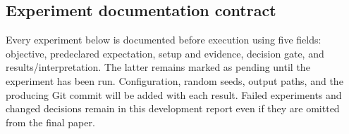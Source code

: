 \subsection{Experiment documentation contract}
Every experiment below is documented before execution using five fields:
objective, predeclared expectation, setup and evidence, decision gate, and
results/interpretation. The latter remains marked as pending until the experiment
has been run. Configuration, random seeds, output paths, and the producing Git
commit will be added with each result. Failed experiments and changed decisions
remain in this development report even if they are omitted from the final paper.
